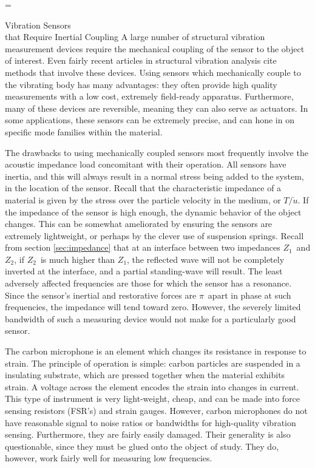 \documentclass[a4paper,10pt]{report}
\makeatletter
\numberwithin{equation}{section}
\let\realnormalsize=\normalsize
\def\liih@math{\ifmmode$\else\bad@math\fi}
\def\adjustnormalsize{\def\normalsize{\mathsurround=0pt \realnormalsize
 \parindent=0pt\abovedisplayskip=0pt\belowdisplayskip=0pt}%
 \def\phantompar{\csname par\endcsname}\normalsize}%
\newcommand\lthtmlvboxmathA{\adjustnormalsize\setbox\sizebox=\vbox\bgroup %
 \let\ifinner=\iffalse \let\)\liih@math }%
\newcommand\lthtmlmathtype[1]{\gdef\lthtmlmathenv{#1}}%
\newcommand\lthtmlfigureA[1]{\let\@savefreelist\@freelist
       \lthtmlmathtype{#1}\lthtmlvboxmathA}%
\makeatother
\begin{document}
{\newpage\clearpage
\lthtmlfigureA{section1053}%
\begin{section}
{Vibration Sensors \\that Require Inertial Coupling}
 A large number of structural vibration measurement devices require the mechanical coupling of the sensor to the object of interest. Even fairly recent articles in structural vibration analysis cite methods that involve these devices. \cite{Han2003} \cite{Kerschen2002} Using sensors which mechanically couple to the vibrating body has many advantages: they often provide high quality measurements with a low cost, extremely field-ready apparatus. Furthermore, many of these devices are reversible, meaning they can also serve as actuators. \cite[p.~69]{Cremer1973} In some applications, these sensors can be extremely precise, and can hone in on specific mode families within the material. \cite[p.~36]{Ballantine1997}
\par
The drawbacks to using mechanically coupled sensors most frequently involve the acoustic impedance load concomitant with their operation. All sensors have inertia, and this will always result in a normal stress being added to the system, in the location of the sensor. Recall that the characteristic impedance of a material is given by the stress over the particle velocity in the medium, or $T/\dot{u}$. If the impedance of the sensor is high enough, the dynamic behavior of the object changes. This can be somewhat ameliorated by ensuring the sensors are extremely lightweight, or perhaps by the clever use of suspension springs. \cite[p.~4]{Cremer1973} Recall from section \ref{sec:impedance} that at an interface between two impedances $Z_1$\  and $Z_2$, if $Z_2$\  is much higher than $Z_1$, the reflected wave will not be completely inverted at the interface, and a partial standing-wave will result. The least adversely affected frequencies are those for which the sensor has a resonance. Since the sensor's inertial and 
restorative forces are $\pi$\  apart in phase at such frequencies, the impedance will tend toward zero. However, the severely limited bandwidth of such a measuring device would not make for a particularly good sensor. \cite[p.~9]{Cremer1973} 
\par
The carbon microphone is an element which changes its resistance in response to strain. The principle of operation is simple: carbon particles are suspended in a insulating substrate, which are pressed together when the material exhibits strain. A voltage across the element encodes the strain into changes in current. This type of instrument is very light-weight, cheap, and can be made into force sensing resistors (FSR's) and strain gauges. However, carbon microphones do not have reasonable signal to noise ratios or bandwidths for high-quality vibration sensing. Furthermore, they are fairly easily damaged. Their generality is also questionable, since they must be glued onto the object of study. They do, however, work fairly well for measuring low frequencies. \cite[p~.26]{Cremer1973}

\end{section}}
\end{document}
